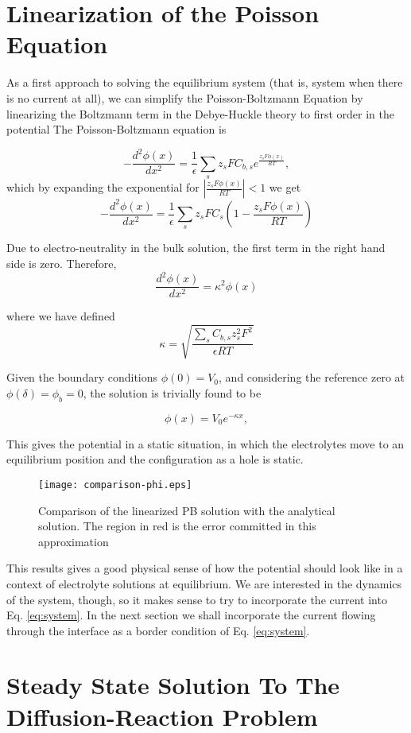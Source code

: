 \section{Linearization of the Poisson Equation}

As a first approach to solving the equilibrium system (that is, system when there is no current at all), we can simplify the Poisson-Boltzmann Equation by linearizing the Boltzmann term in the Debye-Huckle theory to first order in the potential
The Poisson-Boltzmann equation is

$$-\frac{d^2\phi(x)}{dx^2}  =\frac{1}{\epsilon}\sum_s z_s F C_{b,s} e^{\frac{z_s F \phi(x)}{RT}},$$
which by expanding the exponential for $\left|\frac{z_s F \phi(x)}{RT}\right| < 1$ we get
$$-\frac{d^2\phi(x)}{dx^2} =\frac{1}{\epsilon}\sum_s z_s F C_s \left(1-\frac{z_s F \phi(x)}{RT}\right)$$

Due to electro-neutrality in the bulk solution, the first term in the right hand side is zero. Therefore, 
$$\frac{d^2\phi(x)}{dx^2} =\kappa^2 \phi(x)$$

where we have defined 
$$\kappa = \sqrt{\frac{\sum_s C_{b,s} z_s^2 F^2}{\epsilon RT}}$$

Given the boundary conditions $\phi(0) = V_0$, and considering the reference zero at $\phi(\delta) = \phi_b = 0$, the solution is trivially found to be

$$\phi(x) = V_0 e^{-\kappa x},$$

This gives the potential in a static situation, in which the electrolytes move to an equilibrium position and the configuration as a hole is static. 

\begin{figure}[h!]
\label{fig:comparison}
 \centering
 \texttt{[image: comparison-phi.eps]}
 \caption{Comparison of the linearized PB solution with the analytical solution. The region in red is the error committed in this approximation}
\end{figure}

This results gives a good physical sense of how the potential should look like in a context of electrolyte solutions at equilibrium. We are interested in the dynamics of the system, though, so it makes sense to try to incorporate the current into Eq. \ref{eq:system}. In the next section we shall incorporate the current flowing through the interface as a border condition of Eq. \ref{eq:system}.

\section{Steady State Solution To The Diffusion-Reaction Problem}

